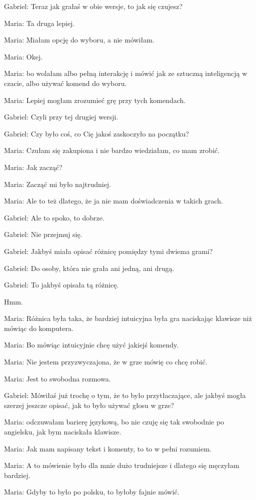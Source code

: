 Gabriel: Teraz jak grałaś w obie wersje, to jak się czujesz?

Maria: Ta druga lepiej.

Maria: Miałam opcję do wyboru, a nie mówiłam.

Maria: Okej.

Maria: bo wolałam albo pełną interakcję i mówić jak ze sztuczną inteligencją w czacie, albo używać komend do wyboru.

Maria: Lepiej mogłam zrozumieć grę przy tych komendach.

Gabriel: Czyli przy tej drugiej wersji.

Gabriel: Czy było coś, co Cię jakoś zaskoczyło na początku?

Maria: Czułam się zakupiona i nie bardzo wiedziałam, co mam zrobić.

Maria: Jak zacząć?

Maria: Zacząć mi było najtrudniej.

Maria: Ale to też dlatego, że ja nie mam doświadczenia w takich grach.

Gabriel: Ale to spoko, to dobrze.

Gabriel: Nie przejmuj się.

Gabriel: Jakbyś miała opisać różnicę pomiędzy tymi dwiema grami?

Gabriel: Do osoby, która nie grała ani jedną, ani drugą.

Gabriel: To jakbyś opisała tą różnicę.

Hmm.

Maria: Różnica była taka, że bardziej intuicyjna była gra naciskając klawisze niż mówiąc do komputera.

Maria: Bo mówiąc intuicyjnie chcę użyć jakiejś komendy.

Maria: Nie jestem przyzwyczajona, że w grze mówię co chcę robić.

Maria: Jest to swobodna rozmowa.

Gabriel: Mówiłaś już trochę o tym, że to było przytłaczające, ale jakbyś mogła szerzej jeszcze opisać, jak to było używać głosu w grze?

Maria: odczuwałam barierę językową, bo nie czuję się tak swobodnie po angielsku, jak bym naciskała klawisze.

Maria: Jak mam napisany tekst i komenty, to to w pełni rozumiem.

Maria: A to mówienie było dla mnie dużo trudniejsze i dlatego się męczyłam bardziej.

Maria: Gdyby to było po polsku, to byłoby fajnie mówić.

